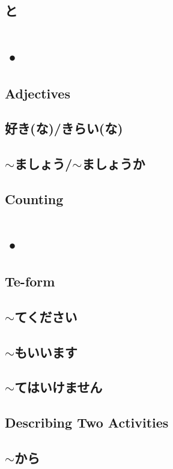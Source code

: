 \documentclass{article}
\begin{document}
   \subsection{と}
   
   \newpage
   
   \section{•}
   \subsection{Adjectives}
   \subsection{好き(な)/きらい(な)}
   \subsection{$\sim$ましょう/$\sim$ましょうか}
   \subsection{Counting}
   
   \newpage
   
   \section{•}
   \subsection{Te-form}
   \subsection{$\sim$てください}
   \subsection{$\sim$もいいます}
   \subsection{$\sim$てはいけません}
   \subsection{Describing Two Activities}
   \subsection{$\sim$から}
\end{document}
